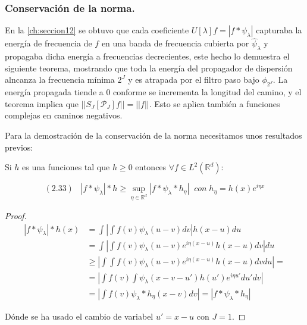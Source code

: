 \subsubsection{Conservación de la norma.}

En la \autoref{ch:seccion12} se obtuvo que cada coeficiente $U[\lambda]f=|f \ast \psi_\lambda|$ capturaba la energía de frecuencia de $f$ en una banda de frecuencia cubierta por $\widehat{\psi}_\lambda$ y propagaba dicha energía a frecuencias decrecientes, este hecho lo demuestra el siguiente teorema, mostrando que toda la energía del propagador de dispersión alncanza la frecuencia mínima $2^J$ y es atrapada por el filtro paso bajo $\phi_ {2^J}$. La energía propagada tiende a $0$ conforme se incrementa la longitud del camino, y el teorema implica que $||S_J[\mathcal{P}_J]f||=||f||$. Esto se aplica también a funciones complejas en caminos negativos.

\medskip

\noindent Para la demostración de la conservación de la norma necesitamos unos resultados previos: 

\begin{lema}
  Si $h$ es una funciones tal que $h\geq 0$ entonces $\forall f \in L^2(\mathbb{R}^d)$: 
  
  $$(2.33) \;\;\; |f \ast \psi_\lambda | \ast h \geq \sup_{\eta \in \mathbb{R}^d} |f\ast \psi_\lambda \ast h_\eta | \; \; con \; h_\eta=h(x)e^{i\eta x}$$
\end{lema}
  
\begin{proof}
  
  \begin{align*}
      |f \ast \psi_\lambda | \ast h (x) &= \int \left| \int f(v)\psi_\lambda(u-v)dv \right| h(x-u)du \\
      &=\int \left | \int f(v) \psi_\lambda(u-v) e^{i\eta(x-u)} h(x-u) dv \right| du \\
      &\geq \left | \int \int f(v) \psi_\lambda(u-v) e^{i\eta(x-u)} h(x-u) dv du \right| = \\
      &= \left | \int f(v) \int  \psi_\lambda(x-v-u')h(u') e^{i\eta u'}  du' dv \right| \\
      &= \left | \int f(v) \psi_\lambda \ast h_\eta(x-v) dv \right| = |f\ast \psi_\lambda \ast h_\eta|
  \end{align*}

  \noindent Dónde se ha usado el cambio de variabel $u'=x-u$ con $J=1$.
\end{proof}

